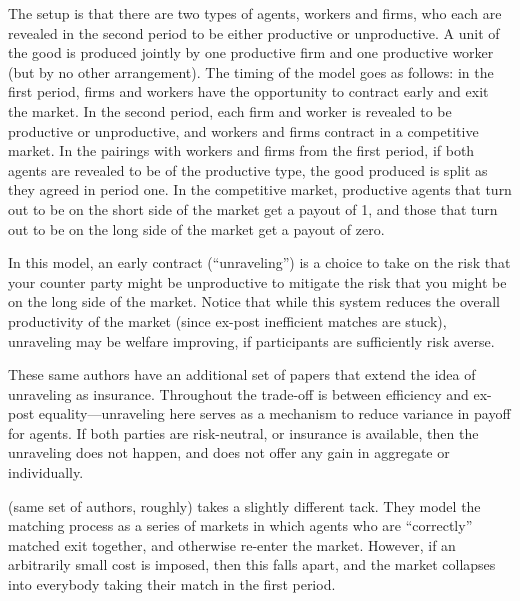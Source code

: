\documentclass[AER]{AEA}
\begin{document}
The setup is that there are two types of agents, workers and firms, who each are revealed in the second period to be either productive or unproductive. A unit of the good is produced jointly by one productive firm and one productive worker (but by no other arrangement). The timing of the model goes as follows: in the first period, firms and workers have the opportunity to contract early and exit the market. In the second period, each firm and worker is revealed  to be productive or unproductive, and workers and firms contract in a competitive market.  In the pairings with workers and firms from the first period, if both agents are revealed to be of the productive type, the good produced is split as they agreed in period one. In the competitive market, productive agents that turn out to be on the short side of the market get a payout of 1, and those that turn out to be on the long side of the market get a payout of zero.


In this model, an early contract (“unraveling”)  is a choice to take on the risk that your counter party might be unproductive to mitigate the risk that you might be on the long side of the market.  Notice that while this system reduces the overall productivity of the market (since ex-post inefficient matches are stuck), unraveling may be welfare improving, if participants are sufficiently risk averse.

These same authors have an additional set of papers \cite{Li2000,Li2004}  that extend the idea of unraveling as insurance.  Throughout the trade-off is between efficiency and ex-post equality—unraveling here serves as a mechanism to reduce variance in payoff for agents.  If both parties are risk-neutral, or insurance is available, then the unraveling does not happen, and does not offer any gain in aggregate or individually.


\cite{Damiano2005} (same set of authors, roughly) takes a slightly different tack.  They model the matching process as a series of markets in which agents who are “correctly” matched exit together, and otherwise re-enter the market.  However, if an arbitrarily small cost is imposed, then this falls apart, and the market collapses into everybody taking their match in the first period. 
\end{document}
